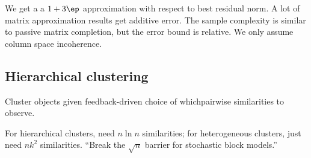 We get a a $1+3\ep$ approximation with respect to best residual norm. A lot of matrix approximation results get additive error. 
The sample complexity is similar to passive matrix completion, but the error bound is relative. 
We only assume column space incoherence.

\subsection{Hierarchical clustering}

Cluster objects given feedback-driven choice of whichpairwise similarities to observe.

For hierarchical clusters, need $n\ln n$ similarities; for heterogeneous clusters, just need $nk^2$ similarities. ``Break the $\sqrt n$ barrier for stochastic block models.''



